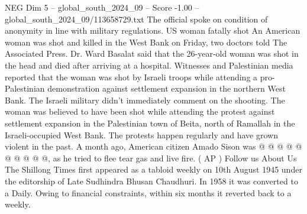 \begin{textsample}{NEG Dim 5 – global\_south\_2024\_09 – Score -1.00 – global\_south\_2024\_09/113658729.txt}
The official spoke on condition of anonymity in line with military regulations.
US woman fatally shot An American woman was shot and killed in the West Bank on Friday, two doctors told The Associated Press.
Dr.
Ward Basalat said that the 26-year-old woman was shot in the head and died after arriving at a hospital.
Witnesses and Palestinian media reported that the woman was shot by Israeli troops while attending a pro-Palestinian demonstration against settlement expansion in the northern West Bank.
The Israeli military didn't immediately comment on the shooting.
The woman was believed to have been shot while attending the protest against settlement expansion in the Palestinian town of Beita, north of Ramallah in the Israeli-occupied West Bank.
The protests happen regularly and have grown violent in the past.
A month ago, American citizen Amado Sison was @ @ @ @ @ @ @ @ @ @, as he tried to flee tear gas and live fire. ( AP ) Follow us About Us The Shillong Times first appeared as a tabloid weekly on 10th August 1945 under the editorship of Late Sudhindra Bhusan Chaudhuri.
In 1958 it was converted to a Daily.
Owing to financial constraints, within six months it reverted back to a weekly.

\end{textsample}
